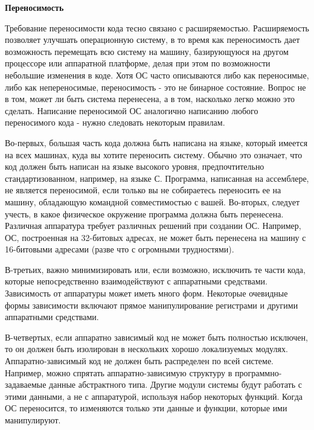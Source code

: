 \hypertarget{opr2_REQ}{\textbf{Переносимость}}

Требование переносимости кода тесно связано с расширяемостью. Расширяемость позволяет улучшать операционную систему, в то время как переносимость дает возможность перемещать всю систему на машину, базирующуюся на другом процессоре или аппаратной платформе, делая при этом по возможности небольшие изменения в коде. Хотя ОС часто описываются либо как переносимые, либо как непереносимые, переносимость - это не бинарное состояние. Вопрос не в том, может ли быть система перенесена, а в том, насколько легко можно это сделать. Написание переносимой ОС аналогично написанию любого переносимого кода - нужно следовать некоторым правилам.

Во-первых, большая часть кода должна быть написана на языке, который имеется на всех машинах, куда вы хотите переносить систему. Обычно это означает, что код должен быть написан на языке высокого уровня, предпочтительно стандартизованном, например, на языке С. Программа, написанная на ассемблере, не является переносимой, если только вы не собираетесь переносить ее на машину, обладающую командной совместимостью с вашей.
Во-вторых, следует учесть, в какое физическое окружение программа должна быть перенесена. Различная аппаратура требует различных решений при создании ОС. Например, ОС, построенная на 32-битовых адресах, не может быть перенесена на машину с 16-битовыми адресами (разве что с огромными трудностями).

В-третьих, важно минимизировать или, если возможно, исключить те части кода, которые непосредственно взаимодействуют с аппаратными средствами. Зависимость от аппаратуры может иметь много форм. Некоторые очевидные формы зависимости включают прямое манипулирование регистрами и другими аппаратными средствами.

В-четвертых, если аппаратно зависимый код не может быть полностью исключен, то он должен быть изолирован в нескольких хорошо локализуемых модулях. Аппаратно-зависимый код не должен быть распределен по всей системе. Например, можно спрятать аппаратно-зависимую структуру в программно-задаваемые данные абстрактного типа. Другие модули системы будут работать с этими данными, а не с аппаратурой, используя набор некоторых функций. Когда ОС переносится, то изменяются только эти данные и функции, которые ими манипулируют.

